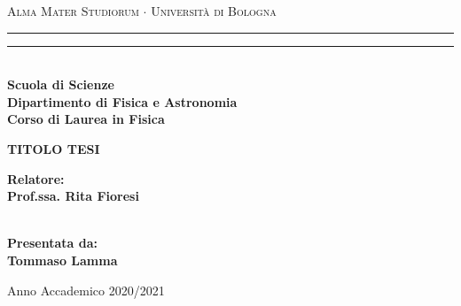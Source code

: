 \documentclass[12pt,a4paper]{report}
\begin{document}
\begin{titlepage}
   \begin{center}
        {{\Large{\textsc{Alma Mater Studiorum $\cdot$ Universit\`a di Bologna}}}} 
        \rule[0.1cm]{15.8cm}{0.1mm}
        \rule[0.5cm]{15.8cm}{0.6mm}
        \\\vspace{3mm}
        {\small{\bf Scuola di Scienze \\ 
        Dipartimento di Fisica e Astronomia\\
        Corso di Laurea in Fisica}}
    \end{center}
    \vspace{23mm}
    \begin{center}
        {{\LARGE{\bf TITOLO TESI}}\\}
    \end{center}
    \vspace{50mm} \par \noindent
    \begin{minipage}[t]{0.47\textwidth}
        {\large{\bf Relatore: \vspace{2mm}\\
        Prof.ssa. Rita Fioresi\\\\
        }}
    \end{minipage}
    \hfill
    \begin{minipage}[t]{0.47\textwidth}\raggedleft
        {\large{\bf Presentata da:
        \vspace{2mm}\\
        Tommaso Lamma}}
    \end{minipage}
    \vspace{40mm}
    \begin{center}
        Anno Accademico 2020/2021
    \end{center}
\end{titlepage}
\end{document}
